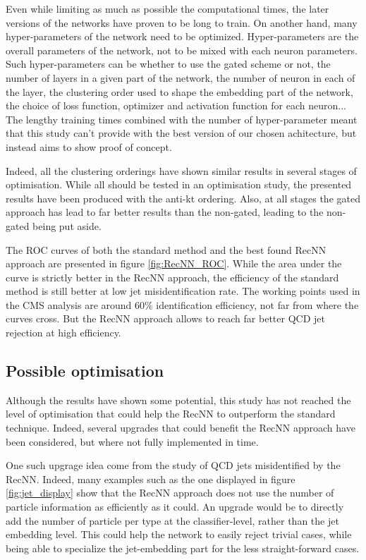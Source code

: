 Even while limiting as much as possible the computational times, the later versions of the networks have proven to be long to train. On another hand, many hyper-parameters of the network need to be optimized. Hyper-parameters are the overall parameters of the network, not to be mixed with each neuron parameters. Such hyper-parameters can be whether to use the gated scheme or not, the number of layers in a given part of the network, the number of neuron in each of the layer, the clustering order used to shape the embedding part of the network, the choice of loss function, optimizer and activation function for each neuron... The lengthy training times combined with the number of hyper-parameter meant that this study can't provide with the best version of our chosen achitecture, but instead aims to show proof of concept.

Indeed, all the clustering orderings have shown similar results in several stages of optimisation. While all should be tested in an optimisation study,  the presented results have been produced with the anti-kt ordering. Also, at all stages the gated approach has lead to far better results than the non-gated, leading to the non-gated being put aside.

The ROC curves of both the standard method and the best found RecNN approach are presented in figure \ref{fig:RecNN_ROC}. While the area under the curve is strictly better in the RecNN approach, the efficiency of the standard method is still better at low jet misidentification rate. The working points used in the CMS analysis are around 60$\%$ identification efficiency, not far from where the curves cross. But the RecNN approach allows to reach far better QCD jet rejection at high \tauh efficiency.

\subsection{Possible optimisation}

Although the results have shown some potential, this study has not reached the level of optimisation that could help the RecNN to outperform the standard technique. Indeed, several upgrades that could benefit the RecNN approach have been considered, but where not fully implemented in time. 

One such upgrage idea come from the study of QCD jets misidentified by the RecNN. Indeed, many examples such as the one displayed in figure \ref{fig:jet_display} show that the RecNN approach does not use the number of particle information as efficiently as it could. An upgrade would be to directly add the number of particle per type at the classifier-level, rather than the jet embedding level. This could help the network to easily reject trivial cases, while being able to specialize the jet-embedding part for the less straight-forward cases.


